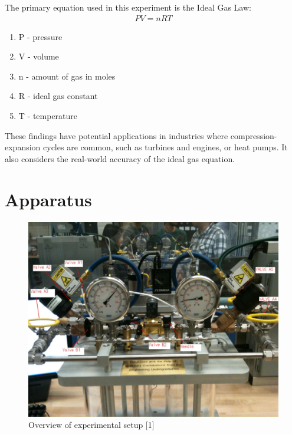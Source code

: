 \documentclass[titlepage, twocolumn, 12pt]{article}
\begin{document}
The primary equation used in this experiment is the Ideal Gas Law:
\begin{align}
    PV = nRT
\end{align}

\begin{enumerate}
    \item P - pressure
	\item V - volume
	\item n - amount of gas in moles
	\item R - ideal gas constant
	\item T - temperature
\end{enumerate}

These findings have potential applications in industries where compression-expansion cycles are common, such as turbines and engines, or heat pumps. It also considers the real-world accuracy of the ideal gas equation.

\section{Apparatus}

\begin{figure}[h]
    \centering
    \includegraphics[scale=0.12]{images/Apparatus.jpeg}
    \caption{Overview of experimental setup [1]}
    \label{fig:app}
\end{figure}
\end{document}
